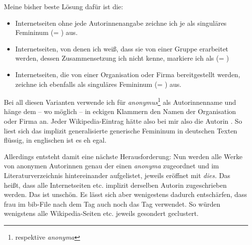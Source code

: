 Meine bisher beste Lösung dafür ist die:

\begin{itemize}
  \item Internetseiten ohne jede Autorinnenangabe zeichne ich je als singuläres Femininum (= ) aus.
  \item Internetseiten, von denen ich weiß, dass sie von einer Gruppe erarbeitet werden, dessen Zusammensetzung ich nicht kenne, markiere ich als (= )
  \item Internetseiten, die von einer Organisation oder Firma bereitgestellt werden, zeichne ich ebenfalls als singuläres Femininum (= ) aus.
\end{itemize}

Bei all diesen Varianten verwende ich  für \emph{anonymus}\footnote{respektive \emph{anonyma}} als Autorinnenname und hänge dem -- wo möglich -- in eckigen Klammern den Namen der Organisation oder Firma an. Jeder Wikipedia-Eintrag hätte also bei mir also die Autorin . So liest sich das implizit generalisierte generische Femininum in deutschen Texten flüssig, in englischen ist es eh egal.

Allerdings entsteht damit eine nächste Herausforderung: Nun werden alle Werke von anonymen Autorinnen genau der einen \emph{anonyma} zugeordnet und im Literaturverzeichnis hintereinander aufgelistet, jeweils eröffnet mit \emph{dies.} Das heißt, dass alle Internetseiten etc. implizit derselben Autorin zugeschrieben werden. Das ist unschön. Es lässt sich aber wenigestens dadurch entschärfen, dass frau im bib-File nach dem Tag  auch noch das Tag  verwendet. So würden wenigstens alle Wikipedia-Seiten etc. jeweils gesondert geclustert.
